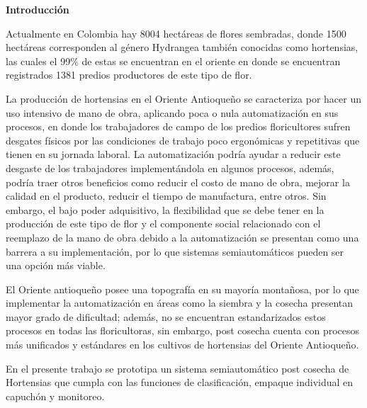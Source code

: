 

\Large 
\textbf{Introducción}

Actualmente en Colombia hay 8004 hectáreas de flores sembradas, donde 1500 hectáreas corresponden al género Hydrangea también conocidas como hortensias, las cuales el 99\% de estas se encuentran en el oriente en donde se encuentran registrados 1381 predios productores de este tipo de flor.

La producción de hortensias en el Oriente Antioqueño se caracteriza por hacer un uso intensivo de mano de obra, aplicando poca o nula automatización en sus procesos, en donde los trabajadores de campo de los predios floricultores sufren desgates físicos por las condiciones de trabajo poco ergonómicas y repetitivas que tienen en su jornada laboral. La automatización podría ayudar a reducir este desgaste de los trabajadores implementándola en algunos procesos, además, podría traer otros beneficios como reducir el costo de mano de obra, mejorar la calidad en el producto, reducir el tiempo de manufactura, entre otros. Sin embargo, el bajo poder adquisitivo, la flexibilidad que se debe tener en la producción de este tipo de flor y el componente social relacionado con el reemplazo de la mano de obra debido a la automatización se presentan como una barrera a su implementación, por lo que sistemas semiautomáticos pueden ser una opción más viable. 

El Oriente antioqueño posee una topografía en su mayoría montañosa, por lo que implementar la automatización en áreas como la siembra y la cosecha presentan mayor grado de dificultad; además, no se encuentran estandarizados estos procesos en todas las floricultoras, sin embargo, post cosecha cuenta con procesos más unificados y estándares en los cultivos de hortensias del Oriente Antioqueño.

En el presente trabajo se prototipa un sistema semiautomático post cosecha de Hortensias que cumpla con las funciones de clasificación, empaque individual en capuchón y monitoreo. 